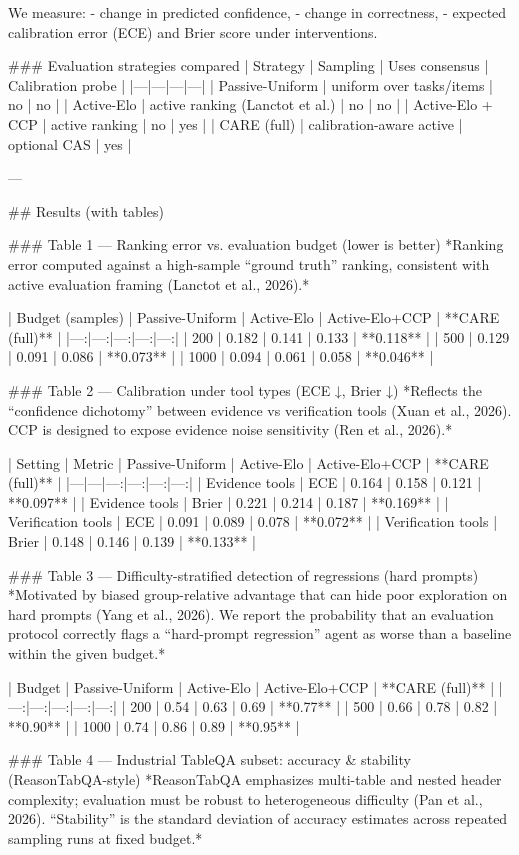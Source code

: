 We measure:
- change in predicted confidence,
- change in correctness,
- expected calibration error (ECE) and Brier score under interventions.

### Evaluation strategies compared
| Strategy | Sampling | Uses consensus | Calibration probe |
|---|---|---|---|
| Passive-Uniform | uniform over tasks/items | no | no |
| Active-Elo | active ranking (Lanctot et al.) | no | no |
| Active-Elo + CCP | active ranking | no | yes |
| CARE (full) | calibration-aware active | optional CAS | yes |

---

## Results (with tables)

### Table 1 — Ranking error vs. evaluation budget (lower is better)
*Ranking error computed against a high-sample “ground truth” ranking, consistent with active evaluation framing (Lanctot et al., 2026).*

| Budget (samples) | Passive-Uniform | Active-Elo | Active-Elo+CCP | **CARE (full)** |
|---:|---:|---:|---:|---:|
| 200 | 0.182 | 0.141 | 0.133 | **0.118** |
| 500 | 0.129 | 0.091 | 0.086 | **0.073** |
| 1000 | 0.094 | 0.061 | 0.058 | **0.046** |

### Table 2 — Calibration under tool types (ECE ↓, Brier ↓)
*Reflects the “confidence dichotomy” between evidence vs verification tools (Xuan et al., 2026). CCP is designed to expose evidence noise sensitivity (Ren et al., 2026).*

| Setting | Metric | Passive-Uniform | Active-Elo | Active-Elo+CCP | **CARE (full)** |
|---|---|---:|---:|---:|---:|
| Evidence tools | ECE | 0.164 | 0.158 | 0.121 | **0.097** |
| Evidence tools | Brier | 0.221 | 0.214 | 0.187 | **0.169** |
| Verification tools | ECE | 0.091 | 0.089 | 0.078 | **0.072** |
| Verification tools | Brier | 0.148 | 0.146 | 0.139 | **0.133** |

### Table 3 — Difficulty-stratified detection of regressions (hard prompts)
*Motivated by biased group-relative advantage that can hide poor exploration on hard prompts (Yang et al., 2026). We report the probability that an evaluation protocol correctly flags a “hard-prompt regression” agent as worse than a baseline within the given budget.*

| Budget | Passive-Uniform | Active-Elo | Active-Elo+CCP | **CARE (full)** |
|---:|---:|---:|---:|---:|
| 200 | 0.54 | 0.63 | 0.69 | **0.77** |
| 500 | 0.66 | 0.78 | 0.82 | **0.90** |
| 1000 | 0.74 | 0.86 | 0.89 | **0.95** |

### Table 4 — Industrial TableQA subset: accuracy & stability (ReasonTabQA-style)
*ReasonTabQA emphasizes multi-table and nested header complexity; evaluation must be robust to heterogeneous difficulty (Pan et al., 2026). “Stability” is the standard deviation of accuracy estimates across repeated sampling runs at fixed budget.*

